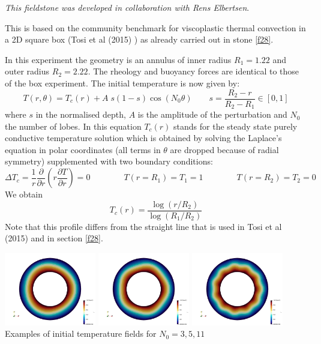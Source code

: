 

{\sl This fieldstone was developed in collaboration with Rens Elbertsen}. 

This is based on the community benchmark for viscoplastic thermal convection
in a 2D square box (Tosi et al (2015) \cite{tosn15}) as already carried out in stone \ref{f28}.

In this experiment the geometry is an annulus of inner radius 
$R_1=1.22$ and outer radius $R_2=2.22$. 
The rheology and buoyancy forces are identical to those of the box 
experiment. The initial temperature is now given by:
\[
T(r,\theta) = T_c(r)+A\; s(1-s) \cos(N_0 \theta)
\quad\quad s=\frac{R_2-r}{R_2-R_1} \in [0,1]
\]
where $s$ in the normalised depth, $A$ is the amplitude of the perturbation and $N_0$ the 
number of lobes. In this equation $T_c(r)$ stands for the steady state purely conductive 
temperature solution which is obtained by solving the Laplace's equation in 
polar coordinates (all terms in $\theta$ are dropped because of radial symmetry) 
supplemented with two boundary conditions:
\[
\Delta T_c = \frac{1}{r}\frac{\partial }{\partial r} \left( r \frac{\partial T}{\partial r} \right) =0 
\quad\quad
\quad\quad
T(r=R_1)=T_1=1
\quad\quad
\quad\quad
T(r=R_2)=T_2=0
\]
We obtain 
\[
T_c(r)=\frac{\log (r/R_2)}{\log(R_1/R_2)}
\]
Note that this profile differs from the straight line that is used in Tosi et al (2015) \cite{tosn15} and in section \ref{f28}.

\begin{center}
\includegraphics[width=4cm]{python_codes/fieldstone_33/images/T_N03}
\includegraphics[width=4cm]{python_codes/fieldstone_33/images/T_N05}
\includegraphics[width=4cm]{python_codes/fieldstone_33/images/T_N11}\\
{\small Examples of initial temperature fields for $N_0=3,5,11$}
\end{center}

